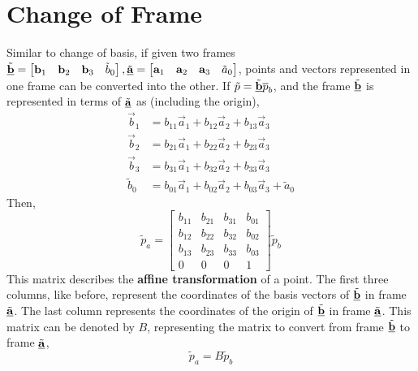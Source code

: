 \documentclass[letterpaper,12pt]{article}
\begin{document}
\section*{Change of Frame}
Similar to change of basis, if given two frames $\tilde{\underline{\mathbf{b}}} = \begin{bmatrix} \mathbf{b}_1 & \mathbf{b}_2 & \mathbf{b}_3 & \tilde{b}_0 \end{bmatrix}, \tilde{\underline{\mathbf{a}}} = \begin{bmatrix} \mathbf{a}_1 & \mathbf{a}_2 & \mathbf{a}_3 & \tilde{a}_0 \end{bmatrix}$, points and vectors represented in one frame can be converted into the other. If $\tilde{p} = \tilde{\underline{\mathbf{b}}} \overline{p}_b$, and the frame $\tilde{\underline{\mathbf{b}}}$ is represented in terms of $\tilde{\underline{\mathbf{a}}}$ as (including the origin),
\begin{align*}
    \vec{b}_1 & = b_{11} \vec{a}_1 + b_{12} \vec{a}_2 + b_{13} \vec{a}_3 \\
    \vec{b}_2 & = b_{21} \vec{a}_1 + b_{22} \vec{a}_2 + b_{23} \vec{a}_3 \\
    \vec{b}_3 & = b_{31} \vec{a}_1 + b_{32} \vec{a}_2 + b_{33} \vec{a}_3 \\
    \tilde{b}_0 & = b_{01} \vec{a}_1 + b_{02} \vec{a}_2 + b_{03} \vec{a}_3 + \tilde{a}_0
\end{align*}
Then,
\begin{equation*}
    \boxed{\tilde{p}_a = \begin{bmatrix} b_{11} & b_{21} & b_{31} & b_{01} \\ b_{12} & b_{22} & b_{32} & b_{02} \\ b_{13} & b_{23} & b_{33} & b_{03} \\ 0 & 0 & 0 & 1 \end{bmatrix} \tilde{p}_b}
\end{equation*}
This matrix describes the \textbf{affine transformation} of a point. The first three columns, like before, represent the coordinates of the basis vectors of $\tilde{\underline{\mathbf{b}}}$ in frame $\tilde{\underline{\mathbf{a}}}$. The last column represents the coordinates of the origin of $\tilde{\underline{\mathbf{b}}}$ in frame $\tilde{\underline{\mathbf{a}}}$. This matrix can be denoted by $B$, representing the matrix to convert from frame $\tilde{\underline{\mathbf{b}}}$ to frame $\tilde{\underline{\mathbf{a}}}$,
\begin{equation*}
    \boxed{\tilde{p}_a = B \tilde{p}_b}
\end{equation*}
\end{document}
